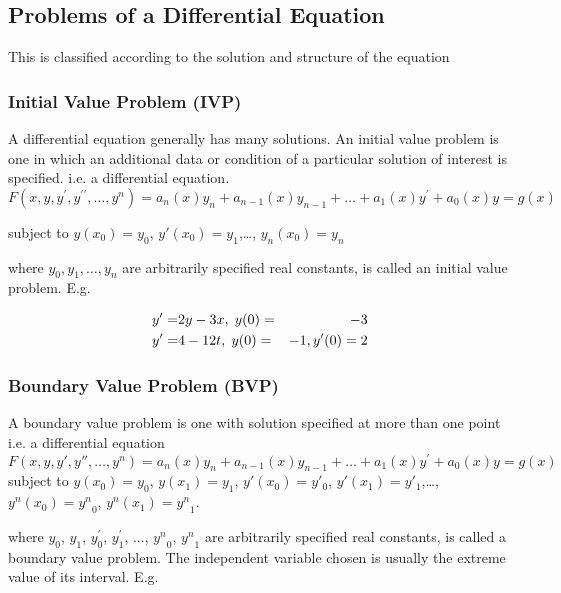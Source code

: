 \documentclass[12pt]{report}
\begin{document}
	\bigskip
	\subsection{Problems of a Differential Equation}\label{sec: Problems of ODE}
	This is classified according to the solution and structure of the equation
	\subsubsection{Initial Value Problem (IVP)}
	A differential equation generally has many solutions. An initial value problem is one in which an additional data or condition of a particular solution of interest is specified. i.e. a differential equation.
	\begin{equation}
	F(x,y,y^\prime,y^{\prime\prime},\dots,y^n ) = a_n(x)y_n + a_{n-1}(x)y_{n-1} + \dots + a_1(x)y^\prime + a_0(x)y = g(x)  
	\end{equation}
	
	subject to
	$y(x_0) = y_0$, $y'(x_0) = y_1$,…, $y_n(x_0) = y_n$
	
	where $y_0, y_1, \dots , y_n$ are arbitrarily specified real constants, is called an initial value problem. E.g.
	
	\begin{eqnarray}
	y' =& 2y - 3x,\hspace{1mm} y(0) =& -3\\
	y'=& 4 - 12t,\hspace{1mm} y(0) =& -1, y'(0) = 2
	\end{eqnarray}
	
	\subsubsection{Boundary Value Problem (BVP)}
	A boundary value problem is one with solution specified at more than one point i.e. a differential equation\\
	\begin{equation}
	F(x,y,y',y'',\dots,y^n ) = a_n(x)y_n + a_{n-1}(x)y_{n-1} +\dots+ a_1(x)y^\prime + a_0(x)y = g(x)
	\end{equation}  subject to
	$y(x_0) = y_0$, $y(x_1) = y_1$, $y'(x_0) = y'_0$, $y'(x_1) = y'_1$,…, $y^n(x_0) = {y^n}_0$, $y^n(x_1) = {y^n}_1$. 
	
	where $y_0$, $y_1$, $y^\prime_0$, $y^\prime_1$, ..., ${y^n}_0$, ${y^n}_1$ are arbitrarily specified real constants, is called a boundary value problem. The independent variable chosen is usually the extreme value of its interval. E.g.
	
\end{document}
